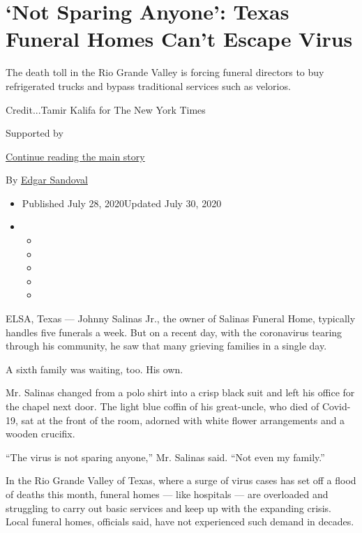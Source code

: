 \hypertarget{not-sparing-anyone-texas-funeral-homes-cant-escape-virus}{%
\section{`Not Sparing Anyone': Texas Funeral Homes Can't Escape
Virus}\label{not-sparing-anyone-texas-funeral-homes-cant-escape-virus}}

The death toll in the Rio Grande Valley is forcing funeral directors to
buy refrigerated trucks and bypass traditional services such as
velorios.

Credit...Tamir Kalifa for The New York Times

Supported by

\protect\hyperlink{after-sponsor}{Continue reading the main story}

By \href{https://www.nytimes.com/by/edgar-sandoval}{Edgar Sandoval}

\begin{itemize}
\item
  Published July 28, 2020Updated July 30, 2020
\item
  \begin{itemize}
  \item
  \item
  \item
  \item
  \item
  \end{itemize}
\end{itemize}

ELSA, Texas --- Johnny Salinas Jr., the owner of Salinas Funeral Home,
typically handles five funerals a week. But on a recent day, with the
coronavirus tearing through his community, he saw that many grieving
families in a single day.

A sixth family was waiting, too. His own.

Mr. Salinas changed from a polo shirt into a crisp black suit and left
his office for the chapel next door. The light blue coffin of his
great-uncle, who died of Covid-19, sat at the front of the room, adorned
with white flower arrangements and a wooden crucifix.

``The virus is not sparing anyone,'' Mr. Salinas said. ``Not even my
family.''

In the Rio Grande Valley of Texas, where a surge of virus cases has set
off a flood of deaths this month, funeral homes --- like hospitals ---
are overloaded and struggling to carry out basic services and keep up
with the expanding crisis. Local funeral homes, officials said, have not
experienced such demand in decades.

